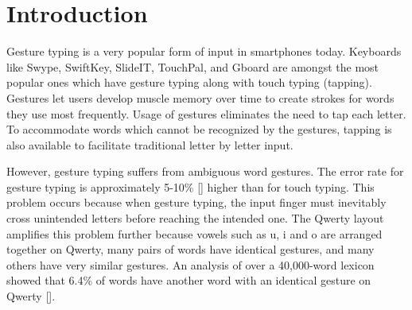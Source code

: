 \documentclass[MTech]{iitmdiss}
\begin{document}




\clearpage




\chapter{Introduction}
\label{chap:intro}


Gesture typing is a very popular form of input in smartphones today. Keyboards like Swype, SwiftKey, SlideIT, TouchPal, and Gboard are amongst the most popular ones which have gesture typing along with touch typing (tapping). Gestures let users develop muscle memory over time to create strokes for words they use most frequently. Usage of gestures eliminates the need to tap each letter. To accommodate words which cannot be recognized by the gestures, tapping is also available to facilitate traditional letter by letter input.




However, gesture typing suffers from ambiguous word gestures. The error rate for gesture typing is approximately 5-10\% [\cite{evaluation}] higher than for touch typing.  This problem occurs because when gesture typing, the input finger must inevitably cross unintended letters before reaching the intended one. The Qwerty layout amplifies this problem further because vowels such as u, i and o are arranged together on Qwerty, many pairs of words have
identical gestures, and many others have very similar gestures. An analysis of over a 40,000-word lexicon showed that 6.4\% of words have another word with an identical gesture on Qwerty [\cite{gesturerecog}].
\end{document}
